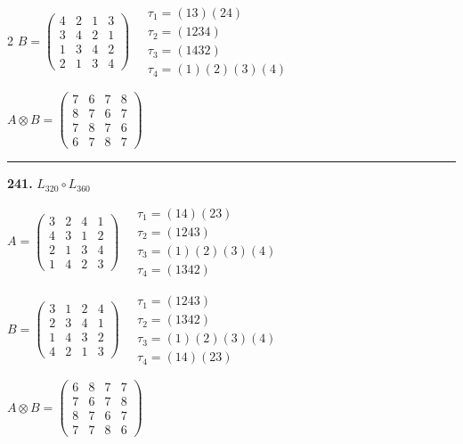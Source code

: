 \begin{multicols}{2}
$B = \begin{pmatrix} 4 & 2 & 1 & 3 \\ 3 & 4 & 2 & 1 \\ 1 & 3 & 4 & 2 \\ 2 & 1 & 3 & 4 \end{pmatrix} \quad \begin{matrix} \tau_{1}=(1 3)(2 4) \\ \tau_{2}=(1 2 3 4) \\ \tau_{3}=(1 4 3 2) \\ \tau_{4}=(1)(2)(3)(4) \end{matrix}$

$A \otimes B = \begin{pmatrix} 7 & 6 & 7 & 8 \\ 8 & 7 & 6 & 7 \\ 7 & 8 & 7 & 6 \\ 6 & 7 & 8 & 7 \end{pmatrix}$

\vspace{0.3em}
\hrule
\vspace{0.3em}

\noindent\textbf{241.} $L_{320} \circ L_{360}$

$A = \begin{pmatrix} 3 & 2 & 4 & 1 \\ 4 & 3 & 1 & 2 \\ 2 & 1 & 3 & 4 \\ 1 & 4 & 2 & 3 \end{pmatrix} \quad \begin{matrix} \tau_{1}=(1 4)(2 3) \\ \tau_{2}=(1 2 4 3) \\ \tau_{3}=(1)(2)(3)(4) \\ \tau_{4}=(1 3 4 2) \end{matrix}$

$B = \begin{pmatrix} 3 & 1 & 2 & 4 \\ 2 & 3 & 4 & 1 \\ 1 & 4 & 3 & 2 \\ 4 & 2 & 1 & 3 \end{pmatrix} \quad \begin{matrix} \tau_{1}=(1 2 4 3) \\ \tau_{2}=(1 3 4 2) \\ \tau_{3}=(1)(2)(3)(4) \\ \tau_{4}=(1 4)(2 3) \end{matrix}$

$A \otimes B = \begin{pmatrix} 6 & 8 & 7 & 7 \\ 7 & 6 & 7 & 8 \\ 8 & 7 & 6 & 7 \\ 7 & 7 & 8 & 6 \end{pmatrix}$


\end{multicols}
